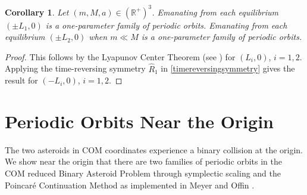 \documentclass[12pt]{article}
\newtheorem{corollary}[theorem]{Corollary}
\begin{document}
\begin{corollary}\label{LyapunovFamily} Let $(m,M,a)\in ({\mathbb R}^+)^3$. Emanating from each equilibrium $(\pm L_1,0)$ is a one-parameter family of periodic orbits. Emanating from each equilibrium $(\pm L_2,0)$ when $m\ll M$ is a one-parameter family of periodic orbits.
\end{corollary}

\begin{proof}
This follows by the Lyapunov Center Theorem (see \cite{meyerOffin}) for $(L_i,0)$, $i=1,2$. Applying the time-reversing symmetry $\hat R_1$ in \eqref{timereversingsymmetry} gives the result for $(-L_i,0)$, $i=1,2$.
\end{proof}





\section{Periodic Orbits Near the Origin}
The two asteroids in COM coordinates experience a binary collision at the origin. We show near the origin that there are two families of periodic orbits in the COM reduced Binary Asteroid Problem through symplectic scaling and the Poincar\'e Continuation Method as implemented in Meyer and Offin \cite{meyerOffin}.
\end{document}
